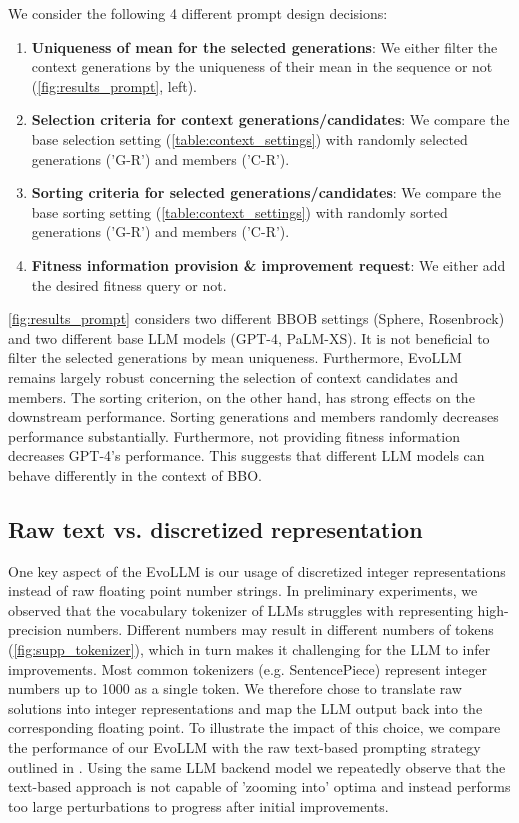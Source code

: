 We consider the following 4 different prompt design decisions:
\begin{enumerate}
\item \textbf{Uniqueness of mean for the selected generations}: We either filter the context generations by the uniqueness of their mean in the sequence or not (\cref{fig:results_prompt}, left).
\item \textbf{Selection criteria for context generations/candidates}: We compare the base selection setting (\cref{table:context_settings}) with randomly selected generations ('G-R') and members ('C-R').
\item \textbf{Sorting criteria for selected generations/candidates}: We compare the base sorting setting (\cref{table:context_settings}) with randomly sorted generations ('G-R') and members ('C-R').
\item \textbf{Fitness information provision \& improvement request}: We either add the desired fitness query or not.
\end{enumerate}
%
\cref{fig:results_prompt} considers two different BBOB settings (Sphere, Rosenbrock) and two different base LLM models (GPT-4, PaLM-XS). It is not beneficial to filter the selected generations by mean uniqueness. Furthermore, EvoLLM remains largely robust concerning the selection of context candidates and members. The sorting criterion, on the other hand, has strong effects on the downstream performance. Sorting generations and members randomly decreases performance substantially. Furthermore, not providing fitness information decreases GPT-4's performance. This suggests that different LLM models can behave differently in the context of BBO.

\subsection{Raw text vs. discretized representation}

One key aspect of the EvoLLM is our usage of discretized integer representations instead of raw floating point number strings. In preliminary experiments, we observed that the vocabulary tokenizer of LLMs struggles with representing high-precision numbers. Different numbers may result in different numbers of tokens (\cref{fig:supp_tokenizer}), which in turn makes it challenging for the LLM to infer improvements. Most common tokenizers (e.g. SentencePiece) represent integer numbers up to 1000 as a single token. We therefore chose to translate raw solutions into integer representations and map the LLM output back into the corresponding floating point.
%
To illustrate the impact of this choice, we compare the performance of our EvoLLM with the raw text-based prompting strategy outlined in \citet{zhang2023using}. Using the same LLM backend model we repeatedly observe that the text-based approach is not capable of 'zooming into' optima and instead performs too large perturbations to progress after initial improvements.

